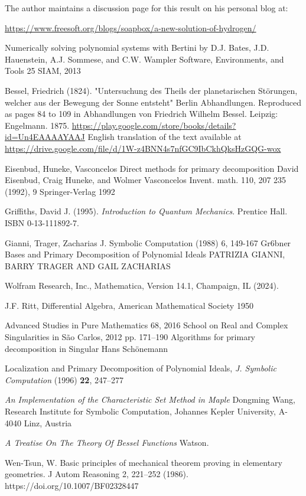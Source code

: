 \documentclass{article}
\begin{document}
The author maintains a discussion page for this result on his personal blog at:

\begin{center}
\small
\url{https://www.freesoft.org/blogs/soapbox/a-new-solution-of-hydrogen/}
\end{center}

\begin{thebibliography}{9}
Numerically solving polynomial systems with Bertini
by D.J. Bates, J.D. Hauenstein, A.J. Sommese, and C.W. Wampler
Software, Environments, and Tools 25
SIAM, 2013

Bessel, Friedrich (1824). "Untersuchung des Theils der planetarischen Störungen, welcher aus der Bewegung der Sonne entsteht"
Berlin Abhandlungen.
Reproduced as pages 84 to 109 in Abhandlungen von Friedrich Wilhelm Bessel. Leipzig: Engelmann. 1875.
\url{https://play.google.com/store/books/details?id=Un4EAAAAYAAJ}
English translation of the text available at
\url{https://drive.google.com/file/d/1W-z4BNN4s7nfGC9IbCkhQksHzGQG-wox}

 Eisenbud, Huneke, Vasconcelos
Direct methods for primary decomposition
David Eisenbud, Craig Huneke, and Wolmer Vasconcelos
Invent. math. 110, 207 235 (1992),
9 Springer-Verlag 1992

Griffiths, David J. (1995). {\it Introduction to Quantum Mechanics}. Prentice Hall. ISBN 0-13-111892-7.

 Gianni, Trager, Zacharias
J. Symbolic Computation (1988) 6, 149-167
Gr6bner Bases and Primary Decomposition of
Polynomial Ideals
PATRIZIA GIANNI, BARRY TRAGER AND GAIL ZACHARIAS

Wolfram Research, Inc., Mathematica, Version 14.1, Champaign, IL (2024).

J.F. Ritt, Differential Algebra, American Mathematical Society 1950

Advanced Studies in Pure Mathematics 68, 2016
School on Real and Complex Singularities in São Carlos, 2012
pp. 171–190
Algorithms for primary decomposition in Singular
Hans Schönemann

 Localization and Primary Decomposition of Polynomial Ideals, {\it J. Symbolic Computation} (1996) {\bf 22}, 247–277

{\it An Implementation of the Characteristic Set Method in Maple}
Dongming Wang,
Research Institute for Symbolic Computation,
Johannes Kepler University, A-4040 Linz, Austria

{\it A Treatise On The Theory Of Bessel Functions}
Watson.

Wen-Tsun, W. Basic principles of mechanical theorem proving in elementary geometries. J Autom Reasoning 2, 221–252 (1986). https://doi.org/10.1007/BF02328447

\end{thebibliography}
\end{document}
